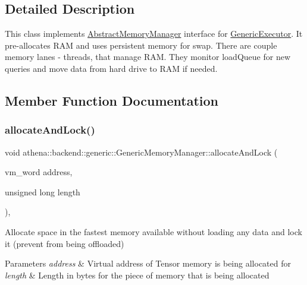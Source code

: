 \subsection{Detailed Description}
This class implements \mbox{\hyperlink{classathena_1_1backend_1_1_abstract_memory_manager}{Abstract\+Memory\+Manager}} interface for \mbox{\hyperlink{classathena_1_1backend_1_1generic_1_1_generic_executor}{Generic\+Executor}}. It pre-\/allocates R\+AM and uses persistent memory for swap. There are couple memory lanes -\/ threads, that manage R\+AM. They monitor load\+Queue for new queries and move data from hard drive to R\+AM if needed. 

\subsection{Member Function Documentation}
\mbox{\label{classathena_1_1backend_1_1generic_1_1_generic_memory_manager_abe837ac5e3bb60c9bc24836788cae679}} 
\subsubsection{\texorpdfstring{allocate\+And\+Lock()}{allocateAndLock()}\hspace{0.1cm}{\footnotesize\ttfamily [1/4]}}
{\footnotesize\ttfamily void athena\+::backend\+::generic\+::\+Generic\+Memory\+Manager\+::allocate\+And\+Lock (\begin{DoxyParamCaption}\item[{vm\+\_\+word}]{address,  }\item[{unsigned long}]{length }\end{DoxyParamCaption})\hspace{0.3cm}{\ttfamily [override]}, {\ttfamily [virtual]}}

Allocate space in the fastest memory available without loading any data and lock it (prevent from being offloaded) 
\begin{DoxyParams}{Parameters}
{\em address} & Virtual address of Tensor memory is being allocated for \\
\hline
{\em length} & Length in bytes for the piece of memory that is being allocated \\
\hline
\end{DoxyParams}


